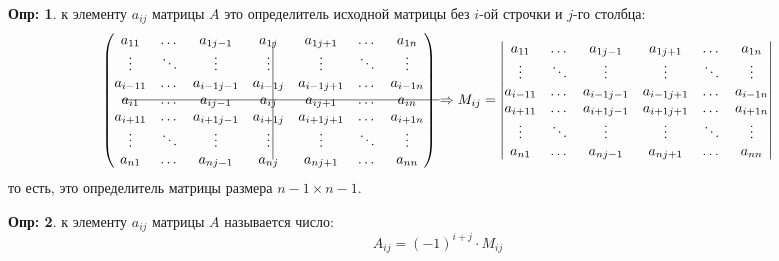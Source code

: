 \documentclass[12pt]{article}
\theoremstyle{definition}
\newtheorem{defn}{Опр:}
\begin{document}
\begin{defn}
	 к элементу $a_{ij}$ матрицы $A$ это определитель исходной матрицы без $i$-ой строчки и $j$-го столбца:
	$$
		\begin{pmatrix}
			a_{11} & \dotsc & a_{1j -1} & a_{1j} & a_{1 j + 1 } & \dotsc & a_{1n}\\
			\vdots & \ddots & \vdots & \vdots &\vdots & \ddots & \vdots\\
			a_{i-1 1} & \dotsc & a_{i-1 j- 1} & a_{i-1 j} & a_{i - 1 j + 1 } & \dotsc & a_{i -1n}\\
			\rlap{\rule[0.6ex]{8cm}{0.4pt}} a_{i 1} & \dotsc & a_{i j- 1}& a_{ij} \makebox(-6,0){\rule[1ex]{0.4pt}{7\normalbaselineskip}}  & a_{ij + 1 } & \dotsc & a_{in}\\
			a_{i + 1 1} & \dotsc & a_{i+1 j -1} & a_{i+1 j} & a_{i + 1 j + 1 } & \dotsc & a_{i + 1n}\\
			\vdots & \ddots & \vdots & \vdots & \vdots & \ddots & \vdots\\
			a_{n1} & \dotsc & a_{n j-1} & a_{nj} &a_{n j + 1 } & \dotsc & a_{nn}
		\end{pmatrix} \Rightarrow
		M_{ij} = 
		\begin{vmatrix}
			a_{11} & \dotsc & a_{1j -1} & a_{1 j + 1 } & \dotsc & a_{1n}\\
			\vdots & \ddots & \vdots & \vdots & \ddots & \vdots\\
			a_{i-1 1} & \dotsc & a_{i-1 j- 1} & a_{i - 1 j + 1 } & \dotsc & a_{i -1n}\\
			a_{i + 1 1} & \dotsc & a_{i+1 j -1} & a_{i + 1 j + 1 } & \dotsc & a_{i + 1n}\\
			\vdots & \ddots & \vdots & \vdots & \ddots & \vdots\\
			a_{n1} & \dotsc & a_{n j-1} & a_{n j + 1 } & \dotsc & a_{nn}
		\end{vmatrix}
	$$
	то есть, это определитель матрицы размера $n-1 \times n-1$.
\end{defn}
\begin{defn}
	 к элементу $a_{ij}$ матрицы $A$ называется число:
	$$
		A_{ij} = (-1)^{i + j}{\cdot}M_{ij}
	$$
\end{defn}
\end{document}
